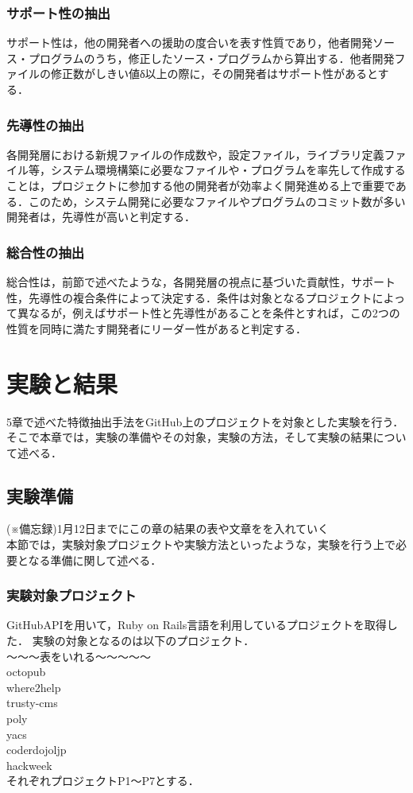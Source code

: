\documentclass{funthesis}
\begin{document}
\subsection{サポート性の抽出}

サポート性は，他の開発者への援助の度合いを表す性質であり，他者開発ソース・プログラムのうち，修正したソース・プログラムから算出する．他者開発ファイルの修正数がしきい値δ以上の際に，その開発者はサポート性があるとする．

\subsection{先導性の抽出}

各開発層における新規ファイルの作成数や，設定ファイル，ライブラリ定義ファイル等，システム環境構築に必要なファイルや・プログラムを率先して作成することは，プロジェクトに参加する他の開発者が効率よく開発進める上で重要である．このため，システム開発に必要なファイルやプログラムのコミット数が多い開発者は，先導性が高いと判定する．

\subsection{総合性の抽出}

総合性は，前節で述べたような，各開発層の視点に基づいた貢献性，サポート性，先導性の複合条件によって決定する．条件は対象となるプロジェクトによって異なるが，例えばサポート性と先導性があることを条件とすれば，この2つの性質を同時に満たす開発者にリーダー性があると判定する．
\chapter{実験と結果}
5章で述べた特徴抽出手法をGitHub上のプロジェクトを対象とした実験を行う．そこで本章では，実験の準備やその対象，実験の方法，そして実験の結果について述べる．
\section{実験準備}
(※備忘録)1月12日までにこの章の結果の表や文章をを入れていく
\\本節では，実験対象プロジェクトや実験方法といったような，実験を行う上で必要となる準備に関して述べる．
\subsection{実験対象プロジェクト}
GitHubAPIを用いて，Ruby on Rails言語を利用しているプロジェクトを取得した．
実験の対象となるのは以下のプロジェクト．
\\〜〜〜表をいれる〜〜〜〜〜
\\octopub
\\where2help
\\trusty-cms
\\poly
\\yacs
\\coderdojoljp
\\hackweek
\\それぞれプロジェクトP1〜P7とする．
\end{document}
